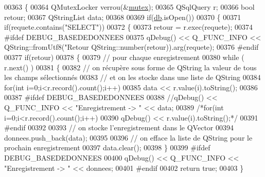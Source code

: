 \begin{DoxyCode}
00363 \{
00364     QMutexLocker verrou(&\hyperlink{class_base_de_donnees_aa1b4696fac87a740f914aa73739086f2}{mutex});
00365     QSqlQuery r;
00366     \textcolor{keywordtype}{bool} retour;
00367     QStringList data;
00368 
00369     \textcolor{keywordflow}{if}(\hyperlink{class_base_de_donnees_a3e738dcf443370c46a541677ab619f06}{db}.isOpen())
00370     \{
00371         \textcolor{keywordflow}{if}(requete.contains(\textcolor{stringliteral}{"SELECT"}))
00372         \{
00373             retour = r.exec(requete);
00374 \textcolor{preprocessor}{            #ifdef DEBUG\_BASEDEDONNEES}
00375             qDebug() << Q\_FUNC\_INFO << QString::fromUtf8(\textcolor{stringliteral}{"Retour %
      QString::number(retour)).arg(requete);
00376 \textcolor{preprocessor}{            #endif}
00377             \textcolor{keywordflow}{if}(retour)
00378             \{
00379                 \textcolor{comment}{// pour chaque enregistrement}
00380                 \textcolor{keywordflow}{while} ( r.next() )
00381                 \{
00382                     \textcolor{comment}{// on récupère sous forme de QString la valeur de tous les champs sélectionnés}
00383                     \textcolor{comment}{// et on les stocke dans une liste de QString}
00384                     \textcolor{keywordflow}{for}(\textcolor{keywordtype}{int} i=0;i<r.record().count();i++)
00385                         data << r.value(i).toString();
00386 
00387 \textcolor{preprocessor}{                    #ifdef DEBUG\_BASEDEDONNEES}
00388                     \textcolor{comment}{//qDebug() << Q\_FUNC\_INFO << "Enregistrement -> " << data;}
00389                     \textcolor{comment}{/*for(int i=0;i<r.record().count();i++)}
00390 \textcolor{comment}{                        qDebug() << r.value(i).toString();*/}
00391 \textcolor{preprocessor}{                    #endif}
00392 
00393                     \textcolor{comment}{// on stocke l'enregistrement dans le QVector}
00394                     donnees.push\_back(data);
00395 
00396                     \textcolor{comment}{// on efface la liste de QString pour le prochain enregistrement}
00397                     data.clear();
00398                 \}
00399 \textcolor{preprocessor}{                #ifdef DEBUG\_BASEDEDONNEES}
00400                 qDebug() << Q\_FUNC\_INFO << \textcolor{stringliteral}{"Enregistrement -> "} << donnees;
00401 \textcolor{preprocessor}{                #endif}
00402                 \textcolor{keywordflow}{return} \textcolor{keyword}{true};
00403             \}
}
\end{DoxyCode}
